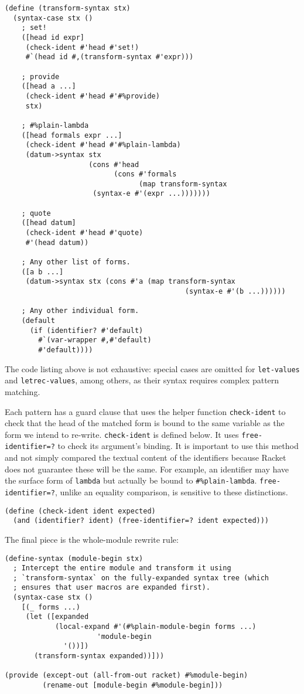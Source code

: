 \documentclass{article}
\begin{document}
\begin{lstlisting}
(define (transform-syntax stx)
  (syntax-case stx ()
    ; set!
    ([head id expr]
     (check-ident #'head #'set!)
     #`(head id #,(transform-syntax #'expr)))

    ; provide
    ([head a ...]
     (check-ident #'head #'#%provide)
     stx)

    ; #%plain-lambda
    ([head formals expr ...]
     (check-ident #'head #'#%plain-lambda)
     (datum->syntax stx
                    (cons #'head
                          (cons #'formals
                                (map transform-syntax
				     (syntax-e #'(expr ...)))))))

    ; quote
    ([head datum]
     (check-ident #'head #'quote)
     #'(head datum))

    ; Any other list of forms.
    ([a b ...]
     (datum->syntax stx (cons #'a (map transform-syntax
                                           (syntax-e #'(b ...))))))

    ; Any other individual form.
    (default
      (if (identifier? #'default)
        #`(var-wrapper #,#'default)
        #'default))))
\end{lstlisting}

The code listing above is not exhaustive: special cases are omitted for \texttt{let-values} and \texttt{letrec-values}, among others, as their syntax requires complex pattern matching.

Each pattern has a guard clause that uses the helper function \texttt{check-ident} to check that the head of the matched form is bound to the same variable as the form we intend to re-write. \texttt{check-ident} is defined below. It uses \texttt{free-identifier=?} to check its argument's binding. It is important to use this method and not simply compared the textual content of the identifiers because Racket does not guarantee these will be the same. For example, an identifier may have the surface form of \texttt{lambda} but actually be bound to \texttt{\#\%plain-lambda}. \texttt{free-identifier=?}, unlike an equality comparison, is sensitive to these distinctions.

\begin{lstlisting}
(define (check-ident ident expected)
  (and (identifier? ident) (free-identifier=? ident expected)))
\end{lstlisting}

The final piece is the whole-module rewrite rule:

\begin{lstlisting}
(define-syntax (module-begin stx)
  ; Intercept the entire module and transform it using
  ; `transform-syntax` on the fully-expanded syntax tree (which
  ; ensures that user macros are expanded first).
  (syntax-case stx ()
    [(_ forms ...)
     (let ([expanded
            (local-expand #'(#%plain-module-begin forms ...)
	                  'module-begin
			  '())])
       (transform-syntax expanded))]))

(provide (except-out (all-from-out racket) #%module-begin)
         (rename-out [module-begin #%module-begin]))
\end{lstlisting}
\end{document}
